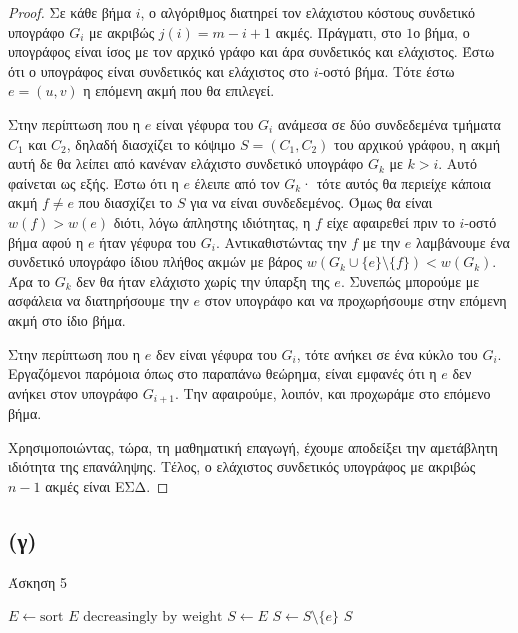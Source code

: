 \documentclass[11pt,a4paper,oneside]{report}
\begin{document}
\begin{proof}
Σε κάθε βήμα $i$, ο αλγόριθμος διατηρεί τον ελάχιστου κόστους συνδετικό υπογράφο $G_i$ με ακριβώς $j(i) = m - i + 1$ ακμές. Πράγματι, στο $1$ο βήμα, ο υπογράφος είναι ίσος με τον αρχικό γράφο και άρα συνδετικός και ελάχιστος. Έστω ότι ο υπογράφος είναι συνδετικός και ελάχιστος στο $i$-οστό βήμα. Τότε έστω $e = (u, v)$ η επόμενη ακμή που θα επιλεγεί.

Στην περίπτωση που η $e$ είναι γέφυρα του $G_i$ ανάμεσα σε δύο συνδεδεμένα τμήματα $C_1$ και $C_2$, δηλαδή διασχίζει το κόψιμο $S = ( C_1, C_2 )$ του αρχικού γράφου, η ακμή αυτή δε θα λείπει από κανέναν ελάχιστο συνδετικό υπογράφο $G_k$ με $k > i$. Αυτό φαίνεται ως εξής. Έστω ότι η $e$ έλειπε από τον $G_k$· τότε αυτός θα περιείχε κάποια ακμή $f \neq e$ που διασχίζει το $S$ για να είναι συνδεδεμένος. Όμως θα είναι $w(f) > w(e)$ διότι, λόγω άπληστης ιδιότητας, η $f$ είχε αφαιρεθεί πριν το $i$-οστό βήμα αφού η $e$ ήταν γέφυρα του $G_i$. Αντικαθιστώντας την $f$ με την $e$ λαμβάνουμε ένα συνδετικό υπογράφο ίδιου πλήθος ακμών με βάρος $w( G_k \cup \{ e \} \setminus \{ f \} ) < w( G_k )$. Άρα το $G_k$ δεν θα ήταν ελάχιστο χωρίς την ύπαρξη της $e$. Συνεπώς μπορούμε με ασφάλεια να διατηρήσουμε την $e$ στον υπογράφο και να προχωρήσουμε στην επόμενη ακμή στο ίδιο βήμα.

Στην περίπτωση που η $e$ δεν είναι γέφυρα του $G_i$, τότε ανήκει σε ένα κύκλο του $G_i$. Εργαζόμενοι παρόμοια όπως στο παραπάνω θεώρημα, είναι εμφανές ότι η $e$ δεν ανήκει στον υπογράφο $G_{i+1}$. Την αφαιρούμε, λοιπόν, και προχωράμε στο επόμενο βήμα.

Χρησιμοποιώντας, τώρα, τη μαθηματική επαγωγή, έχουμε αποδείξει την αμετάβλητη ιδιότητα της επανάληψης. Τέλος, ο ελάχιστος συνδετικός υπογράφος με ακριβώς $n - 1$ ακμές είναι ΕΣΔ.
\end{proof}

\subsection*{(γ)}

\begin{algorithm}[H]
\caption{\textgreek{Άσκηση 5}}
\begin{algorithmic}[1]

	\State $E \gets \text{sort } E \text{ decreasingly by weight}$
	\State $S \gets E$
			\State $S \gets S \setminus \{ e \}$
		\EndIf
	\EndFor
	\State \Return $S$
\EndProcedure
\end{algorithmic}
\end{algorithm}
\end{document}
